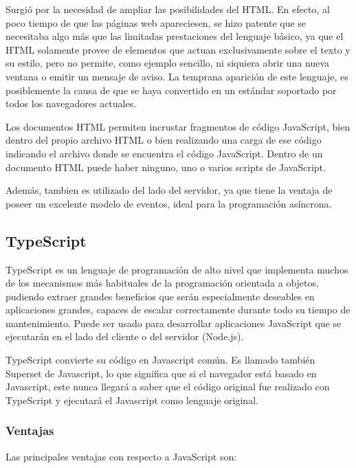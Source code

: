 \documentclass[a4paper, 12pt]{book}
\begin{document}
Surgi\'o por la necesidad de ampliar las posibilidades del HTML. En efecto, al poco tiempo
de que las p\'aginas web apareciesen, se hizo patente que se necesitaba algo m\'as que las limitadas
prestaciones del lenguaje b\'asico, ya que el HTML solamente provee de elementos que actuan
exclusivamente sobre el texto y su estilo, pero no permite, como ejemplo sencillo, ni siquiera
abrir una nueva ventana o emitir un mensaje de aviso. La temprana aparici\'on de este lenguaje,
es posiblemente la causa de que se haya convertido en un est\'andar soportado por todos los
navegadores actuales.

Los documentos HTML permiten incrustar fragmentos de c\'odigo JavaScript, bien dentro
del propio archivo HTML o bien realizando una carga de ese c\'odigo indicando el archivo donde
se encuentra el c\'odigo JavaScript. Dentro de un documento HTML puede haber ninguno, uno o
varios scripts de JavaScript.

Adem\'as, tambien es utilizado del lado del servidor, ya que tiene la ventaja de poseer un
excelente modelo de eventos, ideal para la programaci\'on as\'incrona.


\subsection{TypeScript}
\label{subsec:estilo}

TypeScript es un lenguaje de programaci\'on de alto nivel que implementa muchos de los
mecanismos m\'as habituales de la programaci\'on orientada a objetos, pudiendo extraer grandes
beneficios que ser\'an especialmente deseables en aplicaciones grandes, capaces de escalar correctamente
durante todo su tiempo de mantenimiento. Puede ser usado para desarrollar aplicaciones
JavaScript que se ejecutar\'an en el lado del cliente o del servidor (Node.js).

TypeScript convierte su c\'odigo en Javascript com\'un. Es llamado tambi\'en Superset de Javascript,
lo que significa que si el navegador est\'a basado en Javascript, este nunca llegar\'a a saber que el
c\'odigo original fue realizado con TypeScript y ejecutar\'a el Javascript como lenguaje original.


\subsubsection{Ventajas}
\label{subsec:ventajas}

Las principales ventajas con respecto a JavaScript son:
\end{document}
